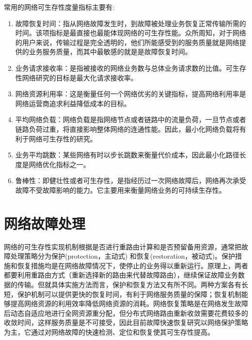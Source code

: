常用的网络可生存性度量指标主要有:
\begin{enumerate}
  \item 故障恢复时间：指从网络故障发生时，到故障被处理业务恢复正常传输所需的时间。该项指标是最直接也最能体现网络的可生存性能。众所周知，对于网络的用户来说，传输过程是完全透明的，他们所能感受到的服务质量就是网络提供的业务服务质量，而其中最敏感的就是是故障恢复时间。
  \item 业务请求接收率：是指被接收的网络业务数与总体业务请求数的比值。可生存性网络研究的目标是最大化请求接收率。
  \item 网络资源利用率：这是衡量任何一个网络优劣的关键指标，提高网络利用率是网络运营商追求利益降低成本的目标。
  \item 平均网络负载：网络负载是指网络节点或者链路中的流量负荷，一旦节点或者链路负荷过重，将直接影响整体网络的连通性能。因此，最小化网络负载将有利于网络可生存性的研究。
  \item 业务平均跳数：某些网络有时以步长跳数来衡量代价成本，因此最小化路径长度是网络优化指标之一。
  \item 鲁棒性：即健壮性或者可生存性，是指经历过一次网络故障后，网络再次承受故障不受故障影响的能力。它主要用来衡量网络业务的可持续生存性。
\end{enumerate}



\section{网络故障处理}


网络的可生存性实现机制根据是否进行重路由计算和是否预留备用资源，通常把故障处理策略分为保护(protection，主动式) 和恢复(restoration，被动式)\cite{hanjianjun2007,kvalbein2009multiple}。保护措施和恢复措施均是在网络故障情况下，使停止的业务得以重新运行。原理上，两者都要利用重路由方式（重新选择新的路由来代替故障路由），继续保证故障业务数据的传输。但就具体实施方法而言，保护和恢复方法又有所不同。两种方案各有长短，保护机制可以提供更快的恢复时间，有利于网络服务质量的保障；恢复机制能够提高网络资源的利用效率降低网络资源的消耗。网络恢复策略是在网络发生故障后动态自适应地进行全网资源重分配，但分布式网络路由重新收敛需要花费较多的收敛时间，这样服务质量是不可接受，因此目前故障快速恢复研究以网络保护策略为主，它通过对网络故障的快速检测、定位和恢复使其可生存性提高。



